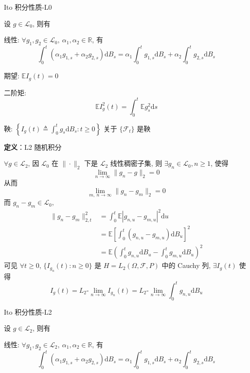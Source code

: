 \documentclass[openany]{ctexbook}
\theoremstyle{kaiti}
\theoremstyle{normal}
\begin{document}
Ito 积分性质-L0

设 $g\in\mathcal{L}_0$, 则有

线性: $\forall g_1,g_2\in\mathcal{L}_0,~\alpha_1,\alpha_2\in\mathbb{R}$, 有
\begin{equation}
  \int_0^t(\alpha_1g_{1,s}+\alpha_2g_{2,s})\mathrm{d}B_s=\alpha_1\int_0^tg_{1,s}\mathrm{d}B_s+\alpha_2\int_0^tg_{2,s}\mathrm{d}B_s
\end{equation}


期望: $\mathbb{E}I_g(t)=0$

二阶矩:
\begin{equation}
  \mathbb{E}I_g^2(t)=\int_0^t\mathbb{E}g_s^2\mathrm{d}s
\end{equation}


鞅: $\displaystyle\left\{I_g(t)\triangleq\int_0^tg_s\mathrm{d}B_s:t\geqslant0\right\}$ 关于 $\{\mathcal{F}_t\}$ 是鞅

\textbf{定义}：L2 随机积分

$\forall g\in\mathcal{L}_2$, 因 $\mathcal{L}_0$ 在 $\|\cdot\|_2$ 下是 $\mathcal{L}_2$ 线性稠密子集, 则 $\exists g_n\in\mathcal{L}_0,n\geqslant1$, 使得
\begin{equation}
  \lim_{n\to\infty}\|g_n-g\|_2=0
\end{equation}
 从而
\begin{equation}
  \lim_{m,~n\to\infty}\|g_n-g_m\|_2=0
\end{equation}
 而 $g_n-g_m\in\mathcal{L}_0$, 
\begin{equation}
  \begin{aligned}
    \|g_n-g_m\|_{2,t}^2&=\int_0^t\mathbb{E}|g_{n,u}-g_{m,u}|^2\mathrm{d}u\\
    &=\mathbb{E}\left[\int_0^t(g_{n,u}-g_{m,u})\mathrm{d}B_u\right]^2\\
    &=\mathbb{E}\left(\int_0^tg_{n,u}\mathrm{d}B_u-\int_0^tg_{m,u}\mathrm{d}B_u\right)^2
  \end{aligned}
\end{equation} 可见 $\forall t\geqslant0$, $\{I_{g_n}(t):n\geqslant0\}$ 是 $H=L_2(\Omega,\mathcal{F},P)$ 中的 Cauchy 列, $\exists I_g(t)$ 使得
\begin{equation}
  I_g(t)=L_2\text{-}\lim_{n\to\infty}I_{g_n}(t)=L_2\text{-}\lim_{n\to\infty}\int_0^tg_{n,u}\mathrm{d}B_u
\end{equation}


Ito 积分性质-L2

设 $g\in\mathcal{L}_2$, 则有

线性: $\forall g_1,g_2\in\mathcal{L}_2,~\alpha_1,\alpha_2\in\mathbb{R}$, 有
\begin{equation}
  \int_0^t(\alpha_1g_{1,s}+\alpha_2g_{2,s})\mathrm{d}B_s=\alpha_1\int_0^tg_{1,s}\mathrm{d}B_s+\alpha_2\int_0^tg_{2,s}\mathrm{d}B_s
\end{equation}
\end{document}
